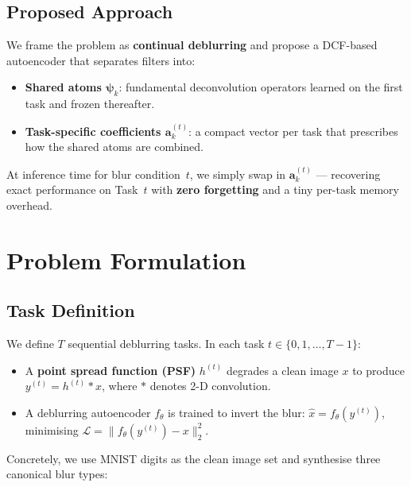 \documentclass[11pt,letterpaper]{article}
\renewcommand{\a}{\mathbf{a}}
\newcommand{\psivec}{\boldsymbol{\psi}}
\begin{document}
\subsection{Proposed Approach}

We frame the problem as \textbf{continual deblurring} and propose a DCF-based
autoencoder that separates filters into:
\begin{itemize}[leftmargin=*]
    \item \textbf{Shared atoms $\psivec_k$}: fundamental deconvolution operators
          learned on the first task and frozen thereafter.
    \item \textbf{Task-specific coefficients $\a_k^{(t)}$}: a compact vector per
          task that prescribes how the shared atoms are combined.
\end{itemize}
At inference time for blur condition~$t$, we simply swap in $\a_k^{(t)}$
--- recovering exact performance on Task~$t$ with \textbf{zero forgetting} and
a tiny per-task memory overhead.

\section{Problem Formulation}
\label{sec:formulation}

\subsection{Task Definition}

We define $T$ sequential deblurring tasks.  In each task
$t \in \{0, 1, \ldots, T{-}1\}$:
\begin{itemize}
    \item A \textbf{point spread function (PSF)} $h^{(t)}$ degrades a clean
          image $x$ to produce $y^{(t)} = h^{(t)} * x$, where $*$ denotes
          2-D convolution.
    \item A deblurring autoencoder $f_\theta$ is trained to invert the blur:
          $\hat{x} = f_\theta(y^{(t)})$, minimising
          $\mathcal{L} = \|f_\theta(y^{(t)}) - x\|_2^2$.
\end{itemize}

Concretely, we use MNIST digits as the clean image set and synthesise three
canonical blur types:
\end{document}
